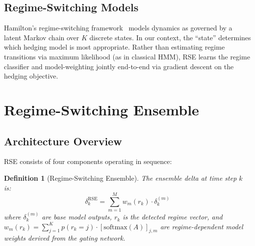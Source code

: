 \documentclass[11pt]{article}
\newtheorem{definition}[theorem]{Definition}
\begin{document}
\subsection{Regime-Switching Models}

Hamilton's regime-switching framework~\citep{hamilton1989new} models dynamics as governed by a latent Markov chain over $K$ discrete states. In our context, the ``state'' determines which hedging model is most appropriate. Rather than estimating regime transitions via maximum likelihood (as in classical HMM), RSE learns the regime classifier and model-weighting jointly end-to-end via gradient descent on the hedging objective.

\section{Regime-Switching Ensemble}
\label{sec:method}

\subsection{Architecture Overview}

RSE consists of four components operating in sequence:

\begin{definition}[Regime-Switching Ensemble]
The ensemble delta at time step $k$ is:
\begin{equation}
    \delta_k^{\mathrm{RSE}} = \sum_{m=1}^{M} w_m(r_k) \cdot \delta_k^{(m)}
    \label{eq:rse}
\end{equation}
where $\delta_k^{(m)}$ are base model outputs, $r_k$ is the detected regime vector, and $w_m(r_k) = \sum_{j=1}^K p(r_k = j) \cdot [\mathrm{softmax}(A)]_{j,m}$ are regime-dependent model weights derived from the gating network.
\end{definition}
\end{document}
